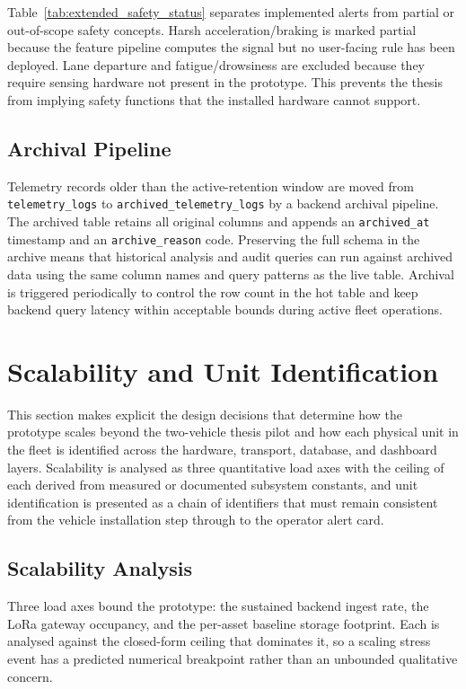 Table~\ref{tab:extended_safety_status} separates implemented alerts from partial or out-of-scope safety concepts. Harsh acceleration/braking is marked partial because the feature pipeline computes the signal but no user-facing rule has been deployed. Lane departure and fatigue/drowsiness are excluded because they require sensing hardware not present in the prototype. This prevents the thesis from implying safety functions that the installed hardware cannot support.

\subsection{Archival Pipeline}
\label{sec:archival_pipeline}
Telemetry records older than the active-retention window are moved from \texttt{telemetry\_logs} to \texttt{archived\_\allowbreak telemetry\_logs} by a backend archival pipeline. The archived table retains all original columns and appends an \texttt{archived\_at} timestamp and an \texttt{archive\_reason} code. Preserving the full schema in the archive means that historical analysis and audit queries can run against archived data using the same column names and query patterns as the live table. Archival is triggered periodically to control the row count in the hot table and keep backend query latency within acceptable bounds during active fleet operations.

\section{Scalability and Unit Identification}
\label{sec:scalability_unit_id}

This section makes explicit the design decisions that determine how the prototype scales beyond the two-vehicle thesis pilot and how each physical unit in the fleet is identified across the hardware, transport, database, and dashboard layers. Scalability is analysed as three quantitative load axes with the ceiling of each derived from measured or documented subsystem constants, and unit identification is presented as a chain of identifiers that must remain consistent from the vehicle installation step through to the operator alert card.

\subsection{Scalability Analysis}
\label{sec:scalability_analysis}

Three load axes bound the prototype: the sustained backend ingest rate, the LoRa gateway occupancy, and the per-asset baseline storage footprint. Each is analysed against the closed-form ceiling that dominates it, so a scaling stress event has a predicted numerical breakpoint rather than an unbounded qualitative concern.

